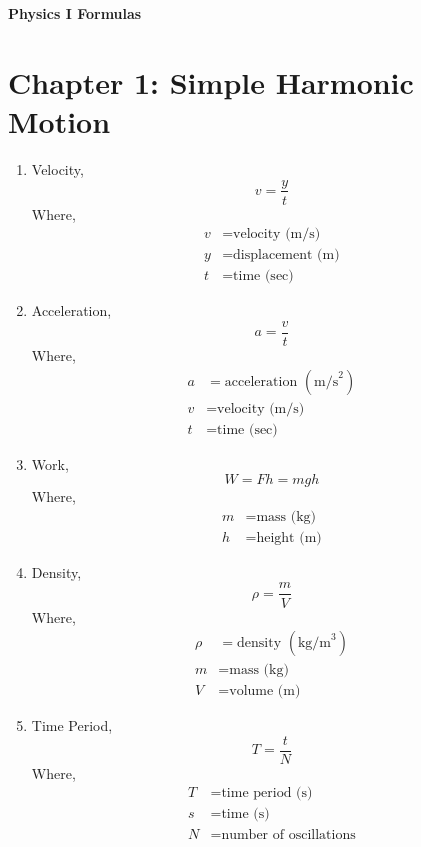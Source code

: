 \documentclass[12pt]{article}
\begin{document}
\begin{center}
    {\LARGE \textbf{Physics I Formulas}} \\  %
\end{center}

\section{Chapter 1: Simple Harmonic Motion}
\begin{enumerate}[label=\roman*.]
	\item Velocity,
		\[
		v = \frac{y}{t}
		\]
		Where,
		\[
		\begin{aligned}
			v &= \text{velocity (m/s)} \\
			y &= \text{displacement (m)} \\
			t &= \text{time (sec)}
		\end{aligned}
		\]

	\item Acceleration,
		\[
		a = \frac{v}{t}
		\]
		Where,
		\[
		\begin{aligned}
			a &= \text{acceleration } (\text{m/s}^2) \\
			v &= \text{velocity (m/s)} \\
			t &= \text{time (sec)}
		\end{aligned}
		\]


	\item Work,
		\[
			W = Fh = mgh
		\]
		Where,
		\begin{align*}
			m &= \text{mass (kg)} \\
			h &= \text{height (m)}
		\end{align*}

	\item Density,
		\[
			\rho = \frac{m}{V}
		\]
		Where,
		\begin{align*}
			\rho &= \text{density } (\text{kg/m}^3) \\
			m &= \text{mass (kg)} \\
			V &= \text{volume (m)}
		\end{align*}

	\item Time Period,
		\[
			T = \frac{t}{N}
		\]
		Where,
		\begin{align*}
			T &= \text{time period (s)} \\
			s &= \text{time (s)} \\
			N &= \text{number of oscillations}
		\end{align*}


\end{enumerate}
\end{document}
